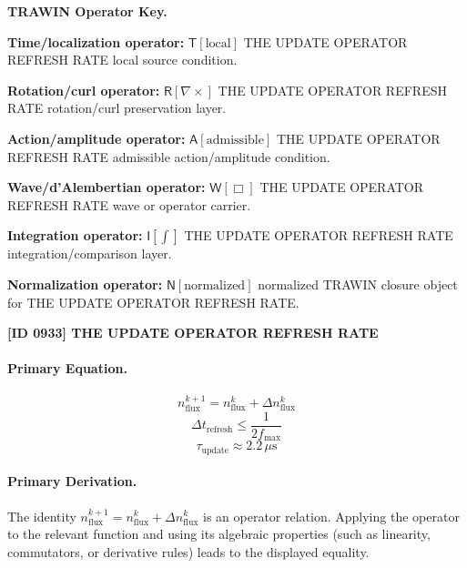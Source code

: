 \par\vspace{0.45\baselineskip}
\noindent\begin{minipage}[t]{\linewidth}
\begingroup
\small
\raggedright
\textbf{TRAWIN Operator Key.}\par
\noindent\textbf{Time/localization operator:} $\mathsf{T}\!\left[\mathrm{local}\right]$ THE UPDATE OPERATOR REFRESH RATE local source condition.\par
\noindent\textbf{Rotation/curl operator:} $\mathsf{R}\!\left[\nabla\times\right]$ THE UPDATE OPERATOR REFRESH RATE rotation/curl preservation layer.\par
\noindent\textbf{Action/amplitude operator:} $\mathsf{A}\!\left[\mathrm{admissible}\right]$ THE UPDATE OPERATOR REFRESH RATE admissible action/amplitude condition.\par
\noindent\textbf{Wave/d'Alembertian operator:} $\mathsf{W}\!\left[\Box\right]$ THE UPDATE OPERATOR REFRESH RATE wave or operator carrier.\par
\noindent\textbf{Integration operator:} $\mathsf{I}\!\left[\int\right]$ THE UPDATE OPERATOR REFRESH RATE integration/comparison layer.\par
\noindent\textbf{Normalization operator:} $\mathsf{N}\!\left[\mathrm{normalized}\right]$ normalized TRAWIN closure object for THE UPDATE OPERATOR REFRESH RATE.\par
\endgroup
\end{minipage}

\clearpage
\noindent\textbf{[ID 0933] THE UPDATE OPERATOR REFRESH RATE}\par
\vspace{0.35em}
\paragraph{Primary Equation.}
\[
n_{\mathrm{flux}}^{k+1}=n_{\mathrm{flux}}^{k}+\Delta n_{\mathrm{flux}}^{k}
\]
\[
\Delta t_{\mathrm{refresh}}\leq \frac{1}{2f_{\max}}
\]
\[
\tau_{\mathrm{update}}\approx 2.2\,\mu\mathrm{s}
\]

\paragraph{Primary Derivation.}
The identity \( n_{\mathrm{flux}}^{k+1}=n_{\mathrm{flux}}^{k}+\Delta n_{\mathrm{flux}}^{k} \) is an operator relation. Applying the operator to the relevant function and using its algebraic properties (such as linearity, commutators, or derivative rules) leads to the displayed equality.
